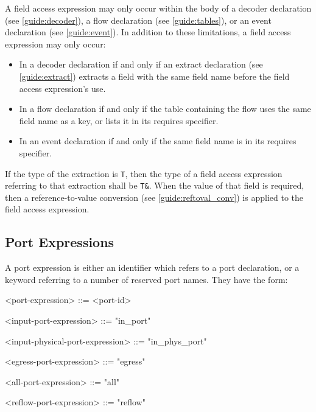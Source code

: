 A field access expression may only occur within the body of a decoder declaration (see \ref{guide:decoder}), a flow declaration (see \ref{guide:tables}), or an event declaration (see \ref{guide:event}). In addition to these limitations, a field access expression may only occur:

\begin{itemize}
\item In a decoder declaration if and only if an extract declaration (see \ref{guide:extract}) extracts a field with the same field name before the field access expression's use.

\item In a flow declaration if and only if the table containing the flow uses the same field name as a key, or lists it in its requires specifier.

\item In an event declaration if and only if the same field name is in its requires specifier.
\end{itemize}

If the type of the extraction is \texttt{T}, then the type of a field access expression referring to that extraction shall be \texttt{T\&}. When the value of that field is required, then a reference-to-value conversion (see \ref{guide:reftoval_conv}) is applied to the field access expression.

\subsection{Port Expressions} \label{guide:port_expr}

A port expression is either an identifier which refers to a port declaration, or a keyword referring to a number of reserved port names. They have the form:

\begin{minip}
\begin{grammar}
<port-expression> ::= <port-id>

<input-port-expression> ::= "in_port"

<input-physical-port-expression> ::= "in_phys_port"

<egress-port-expression> ::= "egress"

<all-port-expression> ::= "all"

<reflow-port-expression> ::= "reflow"
\end{grammar}
\end{minip} 

